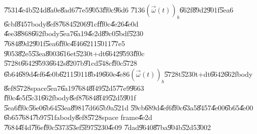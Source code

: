 \documentclass[12pt,a4paper]{article}
\begin{document}
\U{7531}\U{4e4b}\U{524d}\U{8a0e}\U{8ad6}\U{77e5}\U{9053}\U{ff0c}\U{96d6}%
\U{7136}$\left( \vec{\omega}(t)\right) _{b}$\U{662f}\U{89d2}\U{901f}\U{5ea6}%
\U{6cbf}\U{8457}body\U{8ef8}\U{7684}\U{5206}\U{91cf}\U{ff0c}\U{4e26}\U{4e0d}%
\U{4ee3}\U{8868}\U{662f}body\U{5ea7}\U{6a19}\U{4e2d}\U{89c0}\U{5bdf}\U{5230}%
\U{7684}\U{89d2}\U{901f}\U{5ea6}\U{ff0c}\U{4f46}\U{6211}\U{5011}\U{77e5}%
\U{9053}\U{82e5}\U{53ea}\U{8003}\U{616e}t\U{5230}t+dt\U{6642}\U{9593}\U{ff0c}%
\U{5728}t\U{6642}\U{9593}\U{6642}s\U{8207}b\U{91cd}\U{548c}\U{ff0c}\U{5728}%
\U{6b64}\U{689d}\U{4ef6}\U{4e0b}\U{6211}\U{5011}\U{8b49}\U{660e}\U{4e86}$%
\left( \vec{\omega}(t)\right) _{b}$\U{5728}t\U{5230}t+dt\U{6642}\U{662f}body%
\U{8ef8}\U{5728}space\U{5ea7}\U{6a19}\U{7684}\U{8f49}\U{52d5}\U{77e9}\U{9663}%
\U{ff0c}\U{4e5f}\U{5c31}\U{662f}body\U{8ef8}\U{7684}\U{8f49}\U{52d5}\U{901f}%
\U{5ea6}\U{ff0c}\U{56e0}\U{6b64}\U{53ea}\U{8981}\U{7d66}\U{5b9a}\U{521d}%
\U{59cb}\U{689d}\U{4ef6}\U{ff0c}\U{63a5}\U{8457}\U{4e00}\U{6b65}\U{4e00}%
\U{6b65}\U{7684}\U{7b97}\U{51fa}body\U{8ef8}\U{5728}space frame\U{4e2d}%
\U{7684}\U{4f4d}\U{7f6e}\U{ff0c}\U{5373}\U{53ef}\U{5f97}\U{5230}\U{4e09}%
\U{7dad}\U{9640}\U{87ba}\U{904b}\U{52d5}\U{3002}\bigskip

\end{document}

